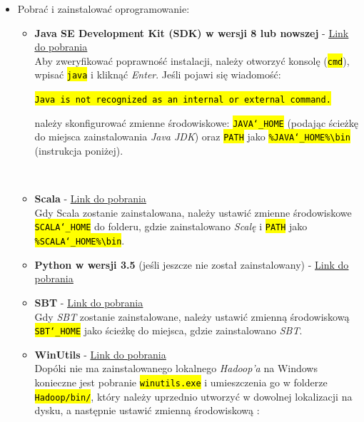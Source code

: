 \documentclass[a4paper,onecolumn,oneside,12pt]{memoir}
\begin{document}
{\begin{itemize}
\item Pobrać i zainstalować oprogramowanie:
\begin{itemize}
\item {
\textbf{Java SE Development Kit (SDK) w wersji 8 lub nowszej} - \underline{\href{http://www.oracle.com/technetwork/java/javase/downloads/jdk8-downloads-2133151.html}{Link do pobrania}}  \\
Aby zweryfikować poprawność instalacji, należy otworzyć konsolę (\texttt{\hl{cmd}}), wpisać \texttt{\hl{java}} i kliknąć \textit{Enter}. Jeśli pojawi się wiadomość: \\
 \centerline{\texttt{\hl{Java is not recognized as an internal or external command.}}}
należy skonfigurować zmienne środowiskowe: 	\texttt{\hl{JAVA{\char`_}HOME}} (podając ścieżkę do miejsca zainstalowania \textit{Java JDK}) oraz \texttt{\hl{PATH}} jako \texttt{\hl{\%JAVA{\char`_}HOME\%\textbackslash bin}} (instrukcja poniżej).
}
\\
\item {
\textbf{Scala} - \underline{\href{http://www.scala-lang.org/download/}{Link do pobrania}}  \\
Gdy Scala zostanie zainstalowana, należy ustawić zmienne środowiskowe \texttt{\hl{SCALA{\char`_}HOME}} do folderu, gdzie zainstalowano \textit{Scalę} i \texttt{\hl{PATH}} jako \texttt{\hl{\%SCALA{\char`_}HOME\%\textbackslash bin}}.
}
\\
\item {
\textbf{Python w wersji 3.5} (jeśli jeszcze nie został zainstalowany) - \underline{\href{https://www.python.org/downloads/windows/}{Link do pobrania}}  
}
\\
\item {
\textbf{SBT} - \underline{\href{http://www.scala-sbt.org/download.html}{Link do pobrania}}  \\
Gdy \textit{SBT} zostanie zainstalowane, należy ustawić zmienną środowiskową  \texttt{\hl{SBT{\char`_}HOME}} jako ścieżkę do miejsca, gdzie zainstalowano \textit{SBT}.
}
\\
\item {
\textbf{WinUtils} - \underline{\href{http://public-repo-1.hortonworks.com/hdp-win-alpha/winutils.exe}{Link do pobrania}}  \\
Dopóki nie ma zainstalowanego lokalnego \textit{Hadoop’a} na Windows konieczne jest pobranie \texttt{\hl{winutils.exe}} i umieszczenia go w folderze \texttt{\hl{Hadoop/bin/}}, który należy uprzednio utworzyć w dowolnej lokalizacji na dysku, a następnie ustawić zmienną środowiskową :

}
\end{itemize}
\end{itemize}}
\end{document}
